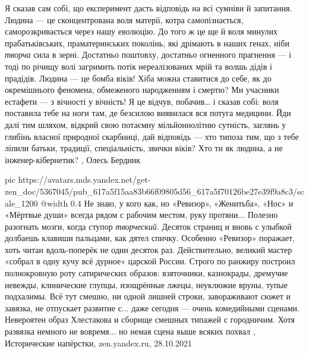 Я сказав сам собі, що експеримент дасть відповідь на всі сумніви й запитання.
Людина — це сконцентрована воля матерії, котра самопізнається,
саморозкривається через нашу еволюцію. До того ж це ще й воля минулих
прабатьківських, праматеринських поколінь, які дрімають в наших генах, ніби
\emph{творча} сила в зерні. Достатньо поштовху, достатньо огненного прагнення — і тоді
по річищу волі загримить потік нереалізованих мрій та волшь дідів і прадідів.
Людина — це бомба віків! Хіба можна ставитися до себе, як до окремішнього
феномена, обмеженого народженням і смертю? Ми учасники естафети — з вічності у
вічність! Я це відчув, побачив… і сказав собі: воля поставила тебе на ноги там,
де безсилою виявилася вся потуга медицини. Йди далі тим шляхом, відкрий свою
потаємну мільйоннолітню сутність, заглянь у глибінь власної природної
скарбниці, дай відповідь — хто типоза тим, що з тебе ліпили батьки, традиції,
спеціальність, звички віків? Хто ти як людина, а не інженер-кібернетик?
, Олесь Бердник

\ifcmt
  pic https://avatars.mds.yandex.net/get-zen_doc/5367045/pub_617a5f15aa83b66f09805d56_617a5f70126be27e39f9a8c3/scale_1200
  @width 0.4
\fi
Не знаю, у кого как, но «Ревизор», «Женитьба», «Нос» и «Мёртвые души» всегда
рядом с рабочим местом, руку протяни... Полезно разогнать мозги, когда ступор
\emph{творческий}. Десяток страниц и вновь с улыбкой долбаешь клавиши пальцами,
как дятел спичку.  Особенно «Ревизор» поражает, хоть читан вдоль-поперёк не
один десяток раз.  Действительно, великий мастер «собрал в одну кучу всё
дурное» царской России.  Строго по ранжиру построил полнокровную роту
сатирических образов: взяточники, казнокрады, дремучие невежды, клинические
глупцы, изощрённые лжецы, неуклюжие вруны, тупые подхалимы.  Всё тут смешно, ни
одной лишней строки, завораживают сюжет и завязка, не отпускает развитие с...
даже сегодня — очень комедийными сценами. Невероятен образ Хлестакова и сборище
смешных типажей с городничим. Хотя развязка немного не вовремя... но немая сцена
выше всяких похвал
, 
Исторические напёрстки, zen.yandex.ru, 28.10.2021


